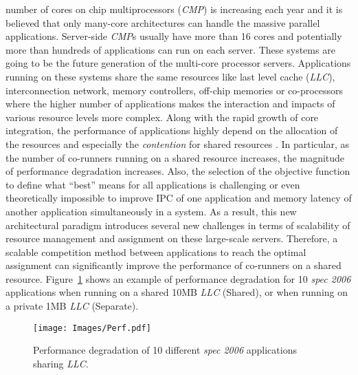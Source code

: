 {} number of cores on chip multiprocessors (\textit{CMP}) is increasing each year and it is believed that only many-core architectures can handle the massive parallel applications. Server-side \textit{CMP}s usually have more than 16 cores and potentially more than hundreds of applications can run on each server. These systems are going to be the future generation of the multi-core processor servers. Applications running on these systems share the same resources like last level cache (\textit{LLC}), interconnection network, memory controllers, off-chip memories or co-processors where the higher number of applications makes the interaction and impacts of various resource levels more complex. Along with the rapid growth of core integration, the performance of applications highly depend on the allocation of the resources and especially the \textit{contention} for shared resources \cite{tang2011impact, zhuravlev2010addressing, hsu2006communist, kim2004fair, cho2006managing, tootaghajICCD, farhat2016stochastic, tootaghaj2016optimal, tootaghaj2015evaluating, farhat2016towardsStoc, tootaghaj2015thesis}. In particular, as the number of co-runners running on a shared resource increases, the magnitude of performance degradation increases. Also, the selection of the objective function to define what \enquote{best} means for all applications is challenging or even theoretically impossible to improve IPC of one application and memory latency of another application simultaneously in a system. As a result, this new architectural paradigm introduces several new challenges in terms of scalability of resource management and assignment on these large-scale servers. Therefore, a scalable competition method between applications to reach the optimal assignment can significantly improve the performance of co-runners on a shared resource. Figure~\ref{fig:Slow_down} shows an example of performance degradation for 10 \textit{spec 2006} applications when running on a shared 10MB \textit{LLC} (Shared), or when running on a private 1MB \textit{LLC} (Separate).  \\
\begin{figure}[!tb]
\centering
\texttt{[image: Images/Perf.pdf]} %
\vspace{-1.5\baselineskip}
\caption{Performance degradation of 10 different \textit{spec 2006} applications sharing \textit{LLC}.}
\label{fig:Slow_down}
\vspace{-1.2\baselineskip}
\end{figure}
